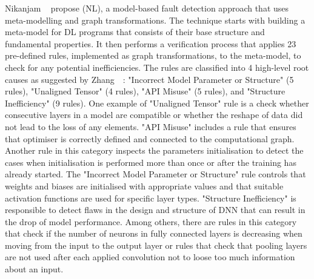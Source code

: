 Nikanjam \etal~\cite{nikanjam2021automatic} propose \NL (NL), a model-based fault detection approach that uses meta-modelling and graph transformations. The technique starts with building a meta-model for DL programs that consists of their base structure and fundamental properties. It then performs a verification process that applies 23 pre-defined rules, implemented as graph transformations, to the meta-model, to check for any potential inefficiencies. The rules are classified into 4 high-level root causes as suggested by Zhang~\etal~\cite{Zhang:2018}:
"Incorrect Model Parameter or Structure" (5 rules), "Unaligned Tensor" (4 rules), "API Misuse" (5 rules), and "Structure Inefficiency" (9 rules). One example of "Unaligned Tensor" rule is a check whether consecutive layers in a model are compatible or whether the reshape of data did not lead to the loss of any elements. "API Misuse" includes a rule that ensures that optimiser is correctly defined and connected to the computational graph.
Another rule in this category inspects the parameters initialisation to detect the cases when initialisation is performed more than once or after the training has already started. The "Incorrect Model Parameter or Structure" rule controls that weights and biases are initialised with appropriate values and that suitable activation functions are used for specific layer types. "Structure Inefficiency" is responsible to detect flaws in the design and structure of DNN that can result in the drop of model performance. Among others, there are rules in this category that 
check if the number of neurons in fully connected layers is decreasing when moving from the input to the output layer or rules that check that pooling layers are not used after each applied convolution not to loose too much information about an input.

